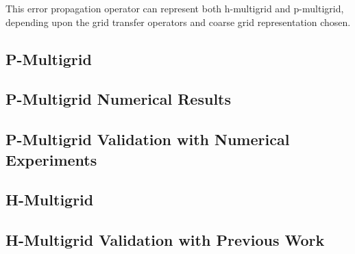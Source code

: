 This error propagation operator can represent both h-multigrid and p-multigrid, depending upon the grid transfer operators and coarse grid representation chosen.

\subsection{P-Multigrid}


\subsection{P-Multigrid Numerical Results}


\subsection{P-Multigrid Validation with Numerical Experiments}


\subsection{H-Multigrid}\label{sec:h-multigrid}


\subsection{H-Multigrid Validation with Previous Work}

